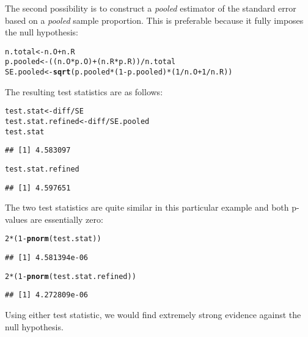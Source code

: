\documentclass[addpoints,12pt]{exam}\usepackage[]{graphicx}\usepackage[]{color}
\makeatletter
\newcommand{\hlnum}[1]{\textcolor[rgb]{0.686,0.059,0.569}{#1}}%
\newcommand{\hlopt}[1]{\textcolor[rgb]{0,0,0}{#1}}%
\newcommand{\hlstd}[1]{\textcolor[rgb]{0.345,0.345,0.345}{#1}}%
\newcommand{\hlkwb}[1]{\textcolor[rgb]{0.69,0.353,0.396}{#1}}%
\newcommand{\hlkwd}[1]{\textcolor[rgb]{0.737,0.353,0.396}{\textbf{#1}}}%
\newenvironment{kframe}{%
 \def\at@end@of@kframe{}%
 \ifinner\ifhmode%
  \def\at@end@of@kframe{\end{minipage}}%
  \begin{minipage}{\columnwidth}%
 \fi\fi%
 \def\FrameCommand##1{\hskip\@totalleftmargin \hskip-\fboxsep
 \colorbox{shadecolor}{##1}\hskip-\fboxsep
     \hskip-\linewidth \hskip-\@totalleftmargin \hskip\columnwidth}%
 \MakeFramed {\advance\hsize-\width
   \@totalleftmargin\z@ \linewidth\hsize
   \@setminipage}}%
 {\par\unskip\endMakeFramed%
 \at@end@of@kframe}
\newenvironment{knitrout}{}{} %
\makeatother
\begin{document}
\begin{questions}
\begin{parts}
\begin{solution}
			The second possibility is to construct a \emph{pooled} estimator of the standard error based on a \emph{pooled} sample proportion. This is preferable because it fully imposes the null hypothesis:
\begin{knitrout}
\color{fgcolor}\begin{kframe}
\begin{alltt}
\hlstd{n.total} \hlkwb{<-} \hlstd{n.O} \hlopt{+} \hlstd{n.R}
\hlstd{p.pooled} \hlkwb{<-} \hlstd{((n.O} \hlopt{*} \hlstd{p.O)} \hlopt{+} \hlstd{(n.R} \hlopt{*} \hlstd{p.R))} \hlopt{/} \hlstd{n.total}
\hlstd{SE.pooled} \hlkwb{<-} \hlkwd{sqrt}\hlstd{(p.pooled} \hlopt{*} \hlstd{(}\hlnum{1} \hlopt{-} \hlstd{p.pooled)} \hlopt{*} \hlstd{(}\hlnum{1}\hlopt{/}\hlstd{n.O} \hlopt{+} \hlnum{1}\hlopt{/}\hlstd{n.R))}
\end{alltt}
\end{kframe}
\end{knitrout}
			The resulting test statistics are as follows:
\begin{knitrout}
\color{fgcolor}\begin{kframe}
\begin{alltt}
\hlstd{test.stat} \hlkwb{<-} \hlstd{diff} \hlopt{/} \hlstd{SE}
\hlstd{test.stat.refined} \hlkwb{<-} \hlstd{diff} \hlopt{/} \hlstd{SE.pooled}
\hlstd{test.stat}
\end{alltt}
\begin{verbatim}
## [1] 4.583097
\end{verbatim}
\begin{alltt}
\hlstd{test.stat.refined}
\end{alltt}
\begin{verbatim}
## [1] 4.597651
\end{verbatim}
\end{kframe}
\end{knitrout}
			The two test statistics are quite similar in this particular example and both p-values are essentially zero:
\begin{knitrout}
\color{fgcolor}\begin{kframe}
\begin{alltt}
\hlnum{2} \hlopt{*} \hlstd{(}\hlnum{1} \hlopt{-} \hlkwd{pnorm}\hlstd{(test.stat))}
\end{alltt}
\begin{verbatim}
## [1] 4.581394e-06
\end{verbatim}
\begin{alltt}
\hlnum{2} \hlopt{*} \hlstd{(}\hlnum{1} \hlopt{-} \hlkwd{pnorm}\hlstd{(test.stat.refined))}
\end{alltt}
\begin{verbatim}
## [1] 4.272809e-06
\end{verbatim}
\end{kframe}
\end{knitrout}
			Using either test statistic, we would find extremely strong evidence against the null hypothesis. 
			\end{solution}
		

\end{parts}
\end{questions}
\end{document}
